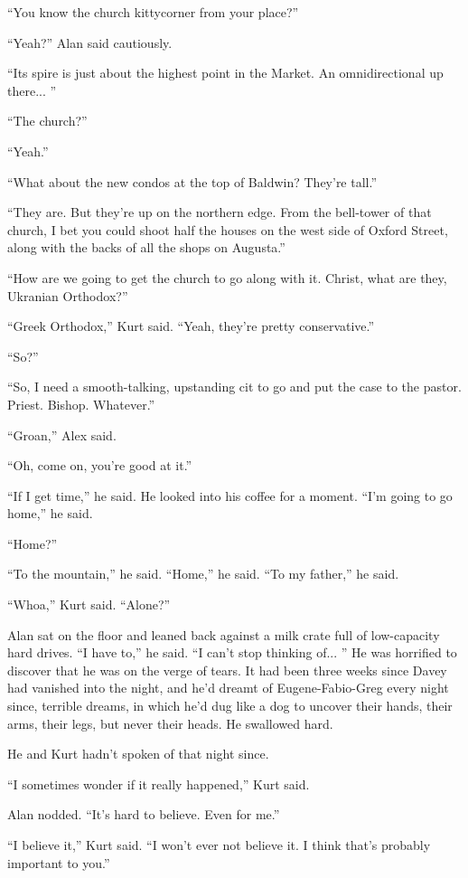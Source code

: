 ``You know the church kittycorner from your place?''

``Yeah?'' Alan said cautiously.

``Its spire is just about the highest point in the Market.  An
omnidirectional up there...  ''

``The church?''

``Yeah.''

``What about the new condos at the top of Baldwin?  They're tall.''

``They are.  But they're up on the northern edge.  From the bell-tower
of that church, I bet you could shoot half the houses on the west side
of Oxford Street, along with the backs of all the shops on Augusta.''

``How are we going to get the church to go along with it.  Christ,
what are they, Ukranian Orthodox?''

``Greek Orthodox,'' Kurt said.  ``Yeah, they're pretty conservative.''

``So?''

``So, I need a smooth-talking, upstanding cit to go and put the case
to the pastor.  Priest.  Bishop.  Whatever.''

``Groan,'' Alex said.

``Oh, come on, you're good at it.''

``If I get time,'' he said.  He looked into his coffee for a moment. 
``I'm going to go home,'' he said.

``Home?''

``To the mountain,'' he said.  ``Home,'' he said.  ``To my father,''
he said.

``Whoa,'' Kurt said.  ``Alone?''

Alan sat on the floor and leaned back against a milk crate full of
low-capacity hard drives.  ``I have to,'' he said.  ``I can't stop
thinking of...  '' He was horrified to discover that he was on the
verge of tears.  It had been three weeks since Davey had vanished into
the night, and he'd dreamt of Eugene-Fabio-Greg every night since,
terrible dreams, in which he'd dug like a dog to uncover their hands,
their arms, their legs, but never their heads.  He swallowed hard.

He and Kurt hadn't spoken of that night since.

``I sometimes wonder if it really happened,'' Kurt said.

Alan nodded.  ``It's hard to believe.  Even for me.''

``I believe it,'' Kurt said.  ``I won't ever not believe it.  I think
that's probably important to you.''

